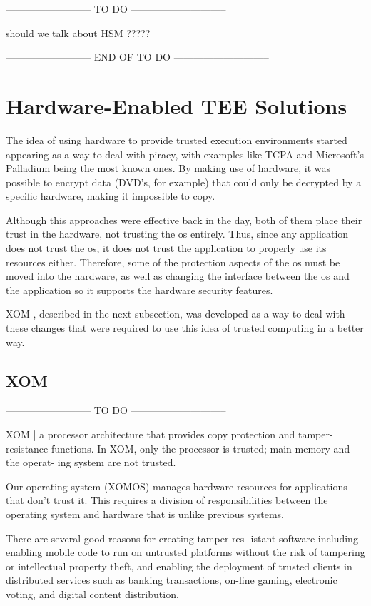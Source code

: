-------------------------- TO DO -----------------------------

 			should we talk about HSM ?????

-------------------------- END OF TO DO -----------------------------

\section{Hardware-Enabled TEE Solutions}


The idea of using hardware to provide trusted execution environments started appearing as a way to deal with piracy, with examples like TCPA and Microsoft's Palladium being the most known ones. By making use of hardware, it was possible to encrypt data (DVD's, for example) that could only be decrypted by a specific hardware, making it impossible to copy. 

Although this approaches were effective back in the day, both of them place their trust in the hardware, not trusting the \gls{os} entirely. 
Thus, since any application does not trust the \gls{os}, it does not trust the application to properly use its resources either. Therefore, some of the protection aspects of the \gls{os} must be moved into the hardware, as well as changing the interface between the \gls{os} and the application so it supports the hardware security features.

XOM \cite{xomPaper}, described in the next subsection, was developed as a way to deal with these changes that were required to use this idea of trusted computing in a better way.


\subsection{XOM}




-------------------------- TO DO -----------------------------



XOM | a processor architecture that provides
copy protection and tamper-resistance functions. In XOM,
only the processor is trusted; main memory and the operat-
ing system are not trusted. 

Our operating system (XOMOS) manages hardware
resources for applications that don't trust it. This requires a
division of responsibilities between the operating system and
hardware that is unlike previous systems.

There are several good reasons for creating tamper-res-
istant software including enabling
mobile code to run on untrusted platforms without the risk
of tampering or intellectual property theft, and enabling the
deployment of trusted clients in distributed services such as
banking transactions, on-line gaming, electronic voting, and
digital content distribution.

